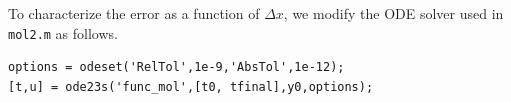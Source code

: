 \begin{itemize}
\begin{figure}[H]
  \centering
  \hfill
  \hfill
  \hfill
  \hfill
  \hfill
\end{figure}
  To characterize the error as a function of $\Delta x$,
  we modify the ODE solver used in \verb|mol2.m| as follows.
\begin{verbatim}
options = odeset('RelTol',1e-9,'AbsTol',1e-12);
[t,u] = ode23s('func_mol',[t0, tfinal],y0,options);
\end{verbatim}


\end{itemize}
